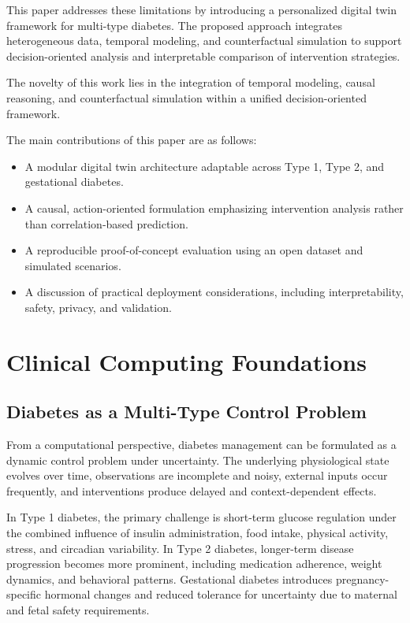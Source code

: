 \documentclass[journal]{IEEEtran}
\begin{document}
This paper addresses these limitations by introducing a personalized digital twin framework for multi-type diabetes. The proposed approach integrates heterogeneous data, temporal modeling, and counterfactual simulation to support decision-oriented analysis and interpretable comparison of intervention strategies.

The novelty of this work lies in the integration of temporal modeling, causal reasoning, and counterfactual simulation within a unified decision-oriented framework.

The main contributions of this paper are as follows:
\begin{itemize}
\item A modular digital twin architecture adaptable across Type 1, Type 2, and gestational diabetes.
\item A causal, action-oriented formulation emphasizing intervention analysis rather than correlation-based prediction.
\item A reproducible proof-of-concept evaluation using an open dataset and simulated scenarios.
\item A discussion of practical deployment considerations, including interpretability, safety, privacy, and validation.
\end{itemize}

\section{Clinical Computing Foundations}
\subsection{Diabetes as a Multi-Type Control Problem}
From a computational perspective, diabetes management can be formulated as a dynamic control problem under uncertainty. The underlying physiological state evolves over time, observations are incomplete and noisy, external inputs occur frequently, and interventions produce delayed and context-dependent effects.

In Type 1 diabetes, the primary challenge is short-term glucose regulation under the combined influence of insulin administration, food intake, physical activity, stress, and circadian variability. In Type 2 diabetes, longer-term disease progression becomes more prominent, including medication adherence, weight dynamics, and behavioral patterns. Gestational diabetes introduces pregnancy-specific hormonal changes and reduced tolerance for uncertainty due to maternal and fetal safety requirements.
\end{document}
